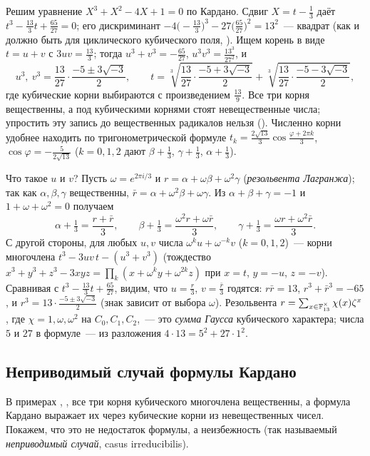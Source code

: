 \begin{aside}
Решим уравнение $X^3+X^2-4X+1=0$ по Кардано. Сдвиг $X=t-\frac13$ даёт $t^3-\frac{13}3t+\frac{65}{27}=0$; его дискриминант
$-4\bigl(-\frac{13}3\bigr)^3-27\bigl(\frac{65}{27}\bigr)^2=13^2$~--- квадрат (как и должно быть для циклического кубического
поля, ). Ищем корень в виде $t=u+v$ с $3uv=\frac{13}3$; тогда $u^3+v^3=-\frac{65}{27}$, $u^3v^3=\frac{13^3}{27^2}$, и
\[
u^3,\ v^3=\frac{13}{27}\cdot\frac{-5\pm3\sqrt{-3}}2,\qquad t=\sqrt[3]{\frac{13}{27}\cdot\frac{-5+3\sqrt{-3}}2}+\sqrt[3]{\frac{13}{27}\cdot\frac{-5-3\sqrt{-3}}2},
\]
где кубические корни выбираются с произведением $\frac{13}9$. Все три корня вещественны, а под кубическими корнями стоят
невещественные числа; упростить эту запись до вещественных радикалов нельзя (). Численно корни удобнее находить
по тригонометрической формуле $t_k=\frac{2\sqrt{13}}3\cos\frac{\varphi+2\pi k}3$, $\cos\varphi=-\frac5{2\sqrt{13}}$ ($k=0,1,2$ дают
$\beta+\frac13$, $\gamma+\frac13$, $\alpha+\frac13$).

Что такое $u$ и $v$? Пусть $\omega=e^{2\pi i/3}$ и $r=\alpha+\omega\beta+\omega^2\gamma$ (\emph{резольвента Лагранжа}); так как
$\alpha,\beta,\gamma$ вещественны, $\bar r=\alpha+\omega^2\beta+\omega\gamma$. Из $\alpha+\beta+\gamma=-1$ и $1+\omega+\omega^2=0$ получаем
\[
\alpha+\tfrac13=\frac{r+\bar r}3,\qquad\beta+\tfrac13=\frac{\omega^2r+\omega\bar r}3,\qquad\gamma+\tfrac13=\frac{\omega r+\omega^2\bar r}3 .
\]
С другой стороны, для любых $u,v$ числа $\omega^ku+\omega^{-k}v$ ($k=0,1,2$)~--- корни многочлена $t^3-3uv\,t-(u^3+v^3)$ (тождество
$x^3+y^3+z^3-3xyz=\prod_k(x+\omega^ky+\omega^{2k}z)$ при $x=t$, $y=-u$, $z=-v$). Сравнивая с $t^3-\frac{13}3t+\frac{65}{27}$, видим,
что $u=\frac r3$, $v=\frac{\bar r}3$ годятся: $r\bar r=13$, $r^3+\bar r^3=-65$, и $r^3=13\cdot\frac{-5\pm3\sqrt{-3}}2$ (знак зависит от
выбора $\omega$). Резольвента $r=\sum_{x\in\mathbb F_{13}^\times}\chi(x)\zeta^x$, где $\chi=1,\omega,\omega^2$ на $C_0,C_1,C_2$,~--- это
\emph{сумма Гаусса} кубического характера; числа $5$ и $27$ в формуле~--- из разложения $4\cdot13=5^2+27\cdot1^2$.
\end{aside}

\subsection*{Неприводимый случай формулы Кардано}

В примерах , ,  все три корня кубического многочлена вещественны, а формула Кардано выражает
их через кубические корни из невещественных чисел. Покажем, что это не недостаток формулы, а неизбежность (так
называемый \emph{неприводимый случай}, casus irreducibilis).

